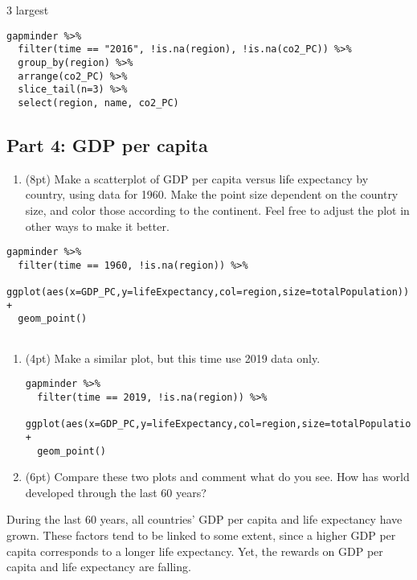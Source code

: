 \documentclass[]{article}
\providecommand{\tightlist}{%
  \setlength{\itemsep}{0pt}\setlength{\parskip}{0pt}}
\begin{document}
3 largest

\begin{verbatim}
gapminder %>% 
  filter(time == "2016", !is.na(region), !is.na(co2_PC)) %>% 
  group_by(region) %>% 
  arrange(co2_PC) %>% 
  slice_tail(n=3) %>% 
  select(region, name, co2_PC) 
\end{verbatim}

\subsection{Part 4: GDP per capita}\label{part-4-gdp-per-capita}

\begin{enumerate}
\def\labelenumi{\arabic{enumi}.}
\tightlist
\item
  (8pt) Make a scatterplot of GDP per capita versus life expectancy by
  country, using data for 1960. Make the point size dependent on the
  country size, and color those according to the continent. Feel free to
  adjust the plot in other ways to make it better.
\end{enumerate}

\begin{verbatim}
gapminder %>% 
  filter(time == 1960, !is.na(region)) %>% 
  ggplot(aes(x=GDP_PC,y=lifeExpectancy,col=region,size=totalPopulation)) +
  geom_point()
  
\end{verbatim}

\begin{enumerate}
\def\labelenumi{\arabic{enumi}.}
\setcounter{enumi}{1}
\item
  (4pt) Make a similar plot, but this time use 2019 data only.

\begin{verbatim}
gapminder %>% 
  filter(time == 2019, !is.na(region)) %>% 
  ggplot(aes(x=GDP_PC,y=lifeExpectancy,col=region,size=totalPopulation)) +
  geom_point()
\end{verbatim}
\item
  (6pt) Compare these two plots and comment what do you see. How has
  world developed through the last 60 years?
\end{enumerate}

During the last 60 years, all countries' GDP per capita and life
expectancy have grown. These factors tend to be linked to some extent,
since a higher GDP per capita corresponds to a longer life expectancy.
Yet, the rewards on GDP per capita and life expectancy are falling.
\end{document}
